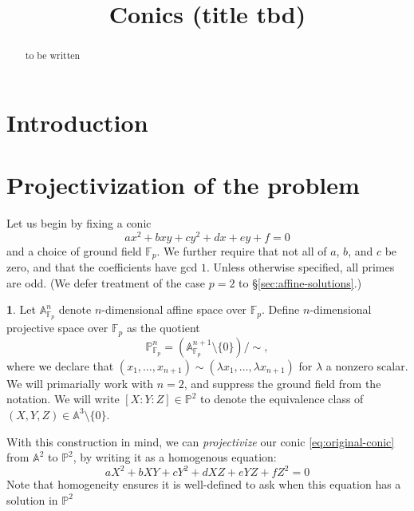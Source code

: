 \documentclass[10pt,a4paper]{amsart}
\numberwithin{equation}{section}
\numberwithin{figure}{section}
\theoremstyle{definition}
\theoremstyle{remark}
\theoremstyle{plain}
\theoremstyle{plain}
\theoremstyle{definition}
\newtheorem{defn}{\protect\definitionname}[section]
\theoremstyle{plain}
\theoremstyle{plain}
\providecommand{\definitionname}{Definition}
\newcommand{\A}{\mathbb{A}}
\renewcommand{\P}{\mathbb{P}}
\newcommand{\F}{\mathbb{F}}
\begin{document}
 

    \title{Conics (title tbd)} 

    \maketitle

    \begin{abstract} 
        to be written 
    \end{abstract}

    \tableofcontents

    \section{Introduction} 
    
    
    
    \section{Projectivization of the problem}

    Let us  begin by fixing a conic
    \begin{equation}\label{eq:original-conic} 
        ax^2 + bxy + cy^2 + dx + ey + f = 0 
    \end{equation} 
    and a choice of ground field $\F_p$. We further require that not all of 
    $a$, $b$, and $c$ be zero, and that the coefficients have gcd $1$.
    Unless otherwise specified, all primes are odd.
    (We defer treatment of the case $p = 2$ to \S\ref{sec:affine-solutions}.)
    \begin{defn}
        Let $\A^n_{\F_p}$ denote $n$-dimensional affine space over $\F_p$. Define 
        $n$-dimensional projective space over $\F_p$ as the quotient
        \[ \P^n_{\F_p} = (\A^{n+1}_{\F_p}\setminus \{0\})/{\sim}, \]
        where we declare that $(x_1,\ldots,x_{n+1}) \sim 
        (\lambda x_1,\ldots,\lambda x_{n+1})$ for $\lambda$ a nonzero scalar. We
        will primarially work with $n = 2$, and suppress the ground field from the 
        notation. We will write $[X:Y:Z]\in \P^2$ to denote the equivalence 
        class of $(X,Y,Z)\in \A^3 \setminus \{0\}$.
    \end{defn}

    With this construction in mind, we can \emph{projectivize} our conic
    \eqref{eq:original-conic} from $\A^2$ to $\P^2$, by writing it as a 
    homogenous equation: 
    \begin{equation}\label{eq:projective-conic} 
        aX^2 + bXY + cY^2 + dXZ + eYZ + fZ^2 = 0 
    \end{equation}
    Note that homogeneity ensures it is well-defined to ask when this
    equation has a solution in $\P^2$
\end{document}
